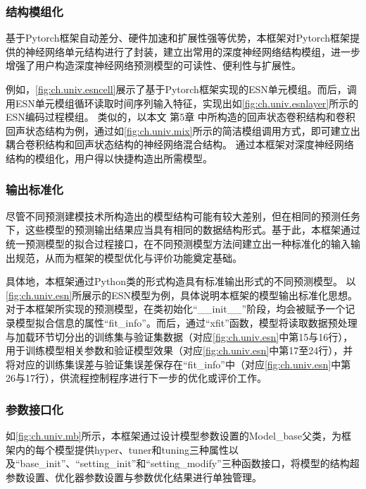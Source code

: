\subsubsection{结构模组化}
基于Pytorch框架自动差分、硬件加速和扩展性强等优势\cite{paszkePytorch2019}，本框架对Pytorch框架提供的神经网络单元结构进行了封装，建立出常用的深度神经网络结构模组，进一步增强了用户构造深度神经网络预测模型的可读性、便利性与扩展性。


例如，\autoref{fig:ch.univ.esncell}展示了基于Pytorch框架实现的ESN单元模组。而后，调用ESN单元模组循环读取时间序列输入特征，实现出如\autoref{fig:ch.univ.esnlayer}所示的ESN编码过程模组。
类似的，以本文
第5章
中所构造的回声状态卷积结构和卷积回声状态结构为例，通过如\autoref{fig:ch.univ.mix}所示的简洁模组调用方式，即可建立出耦合卷积结构和回声状态结构的神经网络混合结构。
通过本框架对深度神经网络结构的模组化，用户得以快捷构造出所需模型。

\subsubsection{输出标准化}
尽管不同预测建模技术所构造出的模型结构可能有较大差别，但在相同的预测任务下，这些模型的预测输出结果应当具有相同的数据结构形式。基于此，本框架通过统一预测模型的拟合过程接口，在不同预测模型方法间建立出一种标准化的输入输出规范，从而为框架的模型优化与评价功能奠定基础。

具体地，本框架通过Python类的形式构造具有标准输出形式的不同预测模型。
以\autoref{fig:ch.univ.esn}所展示的ESN模型为例，具体说明本框架的模型输出标准化思想。
对于本框架所实现的预测模型，在类初始化“__init__”阶段，均会被赋予一个记录模型拟合信息的属性“fit_info”。而后，通过“xfit”函数，模型将读取数据预处理与加载环节切分出的训练集与验证集数据（对应\autoref{fig:ch.univ.esn}中第15与16行），用于训练模型相关参数和验证模型效果（对应\autoref{fig:ch.univ.esn}中第17至24行），并将对应的训练集误差与验证集误差保存在“fit_info”中（对应\autoref{fig:ch.univ.esn}中第26与17行），供流程控制程序进行下一步的优化或评价工作。


\subsubsection{参数接口化}
如\autoref{fig:ch.univ.mb}所示，本框架通过设计模型参数设置的Model_base父类，为框架内的每个模型提供hyper、tuner和tuning三种属性以及“base_init”、“setting_init”和“setting_modify”三种函数接口，将模型的结构超参数设置、优化器参数设置与参数优化结果进行单独管理。

